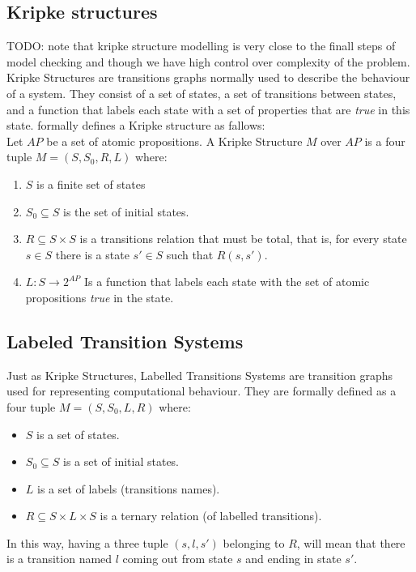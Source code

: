 \documentclass[12pt]{llncs2e/llncs}
\newcommand{\todo}[1]{{\color{red}TODO: #1}}
\begin{document}
\subsection{Kripke structures}\label{kripke} \todo{note that kripke structure modelling is very close to the finall steps of model checking and though we have high control over complexity of the problem.}\\
Kripke Structures are transitions graphs normally used to describe the behaviour of a system. They consist of a set of states, a set of transitions between states, and a function that labels each state with a set of properties that are \textit{true} in this state. \cite{clarke} formally defines a Kripke structure as fallows:\\

Let $AP$ be a set of atomic propositions. A Kripke Structure $M$ over $AP$ is a four tuple $M=(S,S_0,R,L)$ where:
\begin{enumerate}
\item $S$ is a finite set of states
\item $S_0 \subseteq S$ is the set of initial states.
\item $R \subseteq S \times S$ is a transitions relation that must be total, that is, for every state $s \in S$ there is a state $s' \in S$ such that $R(s,s')$.
\item $L : S \rightarrow 2^{AP}$ Is a function that labels each state with the set of atomic propositions \textit{true} in the state.
\end{enumerate}


\subsection{Labeled Transition Systems}\label{lts}
Just as Kripke Structures, Labelled Transitions Systems are transition graphs used for representing computational behaviour. They are formally defined as a four tuple $M = (S,S_{0},L,R)$ where:
\begin{itemize}
\item $S$ is a set of states.
\item $S_0 \subseteq S$ is a set of initial states.
\item $L$ is a set of labels (transitions names).
\item $R \subseteq S \times L \times S$ is a ternary relation (of labelled transitions).
\end{itemize}
In this way, having a three tuple $(s,l,s')$ belonging to $R$, will mean that there is a transition named $l$ coming out from state $s$ and ending in state $s'$.
\end{document}
